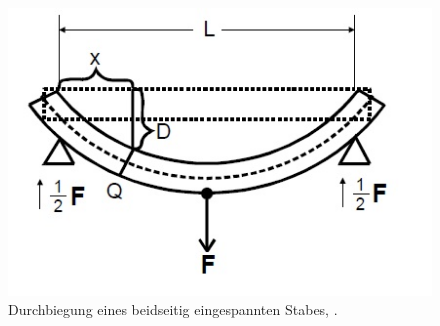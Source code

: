 \begin{figure}[h!]
	\centering
	\includegraphics[width=0.7\linewidth]{beidseitig.jpg}
	\caption{Durchbiegung eines beidseitig eingespannten Stabes, \cite[5]{anleitung103}.}
	\label{fig:beidseitig}
\end{figure}